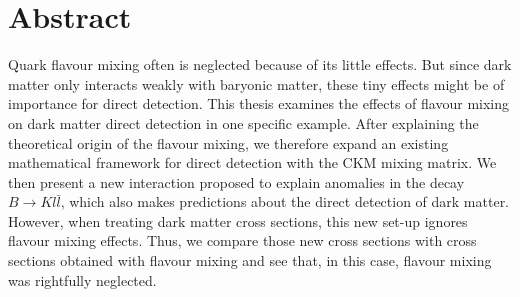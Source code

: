 \thispagestyle{plain}
\section*{Abstract}
Quark flavour mixing often is neglected because of its little effects. But since dark matter only interacts weakly with baryonic matter, these tiny effects might be of importance for direct detection. This thesis examines the effects of flavour mixing on dark matter direct detection in one specific example. After explaining the theoretical origin of the flavour mixing, we therefore expand an existing mathematical framework for direct detection with the CKM mixing matrix. We then present a new interaction proposed to explain anomalies in the decay $B\rightarrow Kl\bar{l}$, which also makes predictions about the direct detection of dark matter. However, when treating dark matter cross sections, this new set-up ignores flavour mixing effects. Thus, we compare those new cross sections with cross sections obtained with flavour mixing and see that, in this case, flavour mixing was rightfully neglected.